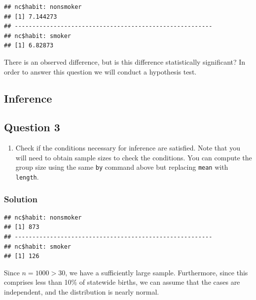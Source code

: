 \documentclass[]{article}
\newenvironment{Shaded}{\begin{snugshade}}{\end{snugshade}}
\newcommand{\KeywordTok}[1]{\textcolor[rgb]{0.13,0.29,0.53}{\textbf{#1}}}
\newcommand{\OperatorTok}[1]{\textcolor[rgb]{0.81,0.36,0.00}{\textbf{#1}}}
\newcommand{\NormalTok}[1]{#1}
\providecommand{\tightlist}{%
  \setlength{\itemsep}{0pt}\setlength{\parskip}{0pt}}
\begin{document}
\begin{verbatim}
## nc$habit: nonsmoker
## [1] 7.144273
## -------------------------------------------------------- 
## nc$habit: smoker
## [1] 6.82873
\end{verbatim}

There is an observed difference, but is this difference statistically
significant? In order to answer this question we will conduct a
hypothesis test.

\subsection{Inference}\label{inference}

\subsection{Question 3}\label{question-3}

\begin{enumerate}
\def\labelenumi{\arabic{enumi}.}
\setcounter{enumi}{2}
\tightlist
\item
  Check if the conditions necessary for inference are satisfied. Note
  that you will need to obtain sample sizes to check the conditions. You
  can compute the group size using the same \texttt{by} command above
  but replacing \texttt{mean} with \texttt{length}.
\end{enumerate}

\subsubsection{Solution}\label{solution-2}

\begin{Shaded}
\end{Shaded}

\begin{verbatim}
## nc$habit: nonsmoker
## [1] 873
## -------------------------------------------------------- 
## nc$habit: smoker
## [1] 126
\end{verbatim}

Since \(n = 1000 > 30\), we have a sufficiently large sample.
Furthermore, since this comprises less than 10\% of statewide births, we
can assume that the cases are independent, and the distribution is
nearly normal.
\end{document}

